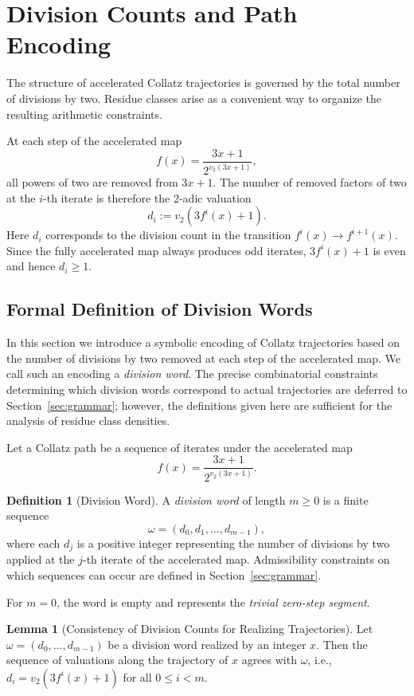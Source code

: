 \documentclass[12pt, oneside]{article}   	%
\numberwithin{equation}{section}          %
\theoremstyle{definition}
\newtheorem{define}{Definition}[section]
\newtheorem{lemma}[theorem]{Lemma}
\begin{document}
\newpage
\section{Division Counts and Path Encoding}
\label{sec:division-counts}

The structure of accelerated Collatz trajectories is governed by the total number of divisions by
two. Residue classes arise as a convenient way to organize the resulting arithmetic constraints.

At each step of the accelerated map
\[
f(x) = \frac{3x+1}{2^{v_2(3x+1)}},
\]
all powers of two are removed from \(3x+1\). The number of removed factors of two at the
\(i\)-th iterate is therefore the 2-adic valuation
\[
d_i := v_2(3 f^i(x) + 1).
\]
Here $d_i$ corresponds to the division count in the transition $f^i(x) \rightarrow f^{i+1}(x)$.
Since the fully accelerated map always produces odd iterates, $3 f^i(x) + 1$ is even and hence
$d_i \ge 1$. 


\subsection{Formal Definition of Division Words}

In this section we introduce a symbolic encoding of Collatz trajectories
based on the number of divisions by two removed at each step of the accelerated map.
We call such an encoding a \emph{division word}. The precise combinatorial
constraints determining which division words correspond to actual trajectories
are deferred to Section~\ref{sec:grammar}; however, the definitions
given here are sufficient for the analysis of residue class densities.

Let a Collatz path be a sequence of iterates under the accelerated map
\[
f(x) = \frac{3x+1}{2^{v_2(3x+1)}}.
\]

\begin{define}[Division Word]
A \emph{division word} of length $m \ge 0$ is a finite sequence
\[
\omega = (d_0, d_1, \dots, d_{m-1}),
\]
where each $d_j$ is a positive integer representing the number of divisions
by two applied at the $j$-th iterate of the accelerated map.  Admissibility
constraints on which sequences can occur are defined in Section~\ref{sec:grammar}.

For $m=0$, the word is empty and represents the \emph{trivial zero-step segment}.
\end{define}

\begin{lemma}[Consistency of Division Counts for Realizing Trajectories]
Let $\omega = (d_0,\dots,d_{m-1})$ be a division word realized by an integer $x$.
Then the sequence of valuations along the trajectory of $x$ agrees with $\omega$,
i.e., $d_i = v_2(3 f^i(x) + 1)$ for all $0 \le i < m$.
\end{lemma}
\end{document}
